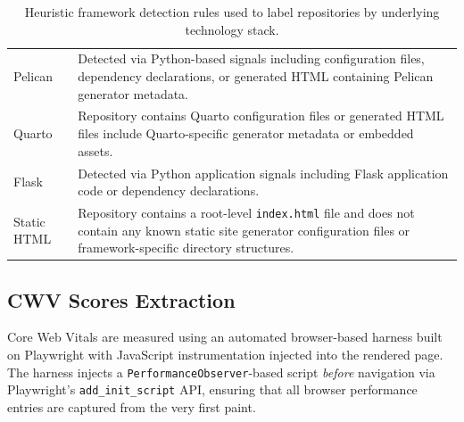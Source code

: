 \begin{table}[t]
\begin{tabularx}{\textwidth}{p{3.2cm} X}
Pelican &
Detected via Python-based signals including configuration files, dependency declarations, or generated HTML containing Pelican generator metadata. \\

Quarto &
Repository contains Quarto configuration files or generated HTML files include Quarto-specific generator metadata or embedded assets. \\

Flask &
Detected via Python application signals including Flask application code or dependency declarations. \\

Static HTML &
Repository contains a root-level \texttt{index.html} file and does not contain any known static site generator configuration files or framework-specific directory structures. \\

\hline
\end{tabularx}
\caption{Heuristic framework detection rules used to label repositories by underlying technology stack.}
\label{tab:framework-detection-heuristics}
\end{table}




\subsection{CWV Scores Extraction}
\label{subsection:instrumentation}

Core Web Vitals are measured using an automated browser-based harness built on Playwright with JavaScript instrumentation injected into the rendered page. The harness injects a \texttt{PerformanceObserver}-based script \emph{before} navigation via Playwright's \texttt{add\_init\_script} API, ensuring that all browser performance entries are captured from the very first paint.

